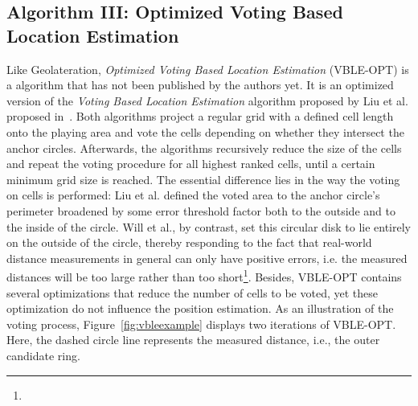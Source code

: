 \subsection{Algorithm III: Optimized Voting Based Location Estimation}
Like Geolateration, \emph{Optimized Voting Based Location Estimation} (VBLE-OPT) is a algorithm that has not been published by the authors yet. It is an optimized version of the \emph{Voting Based Location Estimation} algorithm proposed by Liu et al. proposed in~\cite{liu2005attackresistant}. Both algorithms project a regular grid with a defined cell length onto the playing area and vote the cells depending on whether they intersect the anchor circles. Afterwards, the algorithms recursively reduce the size of the cells and repeat the voting procedure for all highest ranked cells, until a certain minimum grid size is reached. The essential difference lies in the way the voting on cells is performed: Liu et al. defined the voted area to the anchor circle's perimeter broadened by some error threshold factor both to the outside and to the inside of the circle. Will et al., by contrast, set this circular disk to lie entirely on the outside of the circle, thereby responding to the fact that real-world distance measurements in general can only have positive errors, i.e. the measured distances will be too large rather than too short\footnote{}. Besides, VBLE-OPT contains several optimizations that reduce the number of cells to be voted, yet these optimization do not influence the position estimation. As an illustration of the voting process, Figure~\ref{fig:vbleexample} displays two iterations of VBLE-OPT. Here, the dashed circle line represents the measured distance, i.e., the outer candidate ring. 

